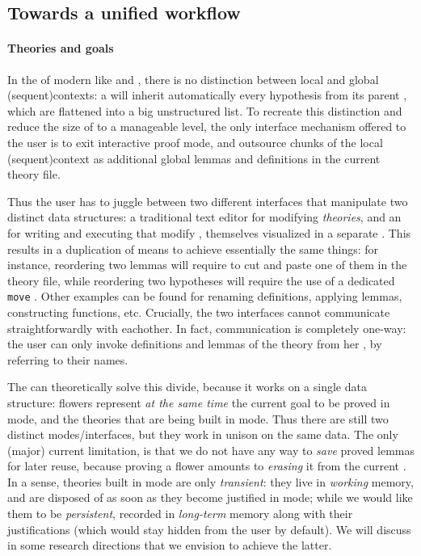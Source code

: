 \begin{scope}
\subsection{Towards a unified workflow}

\paragraph{Theories and goals}

In the  of modern  like  and
, there is no distinction between local and global
\kl(sequent){contexts}: a  will inherit automatically every
hypothesis from its parent , which are flattened into a big
unstructured list. To recreate this distinction and reduce the size of
 to a manageable level, the only interface mechanism offered to the
user is to exit interactive proof mode, and outsource chunks of the local
\kl(sequent){context} as additional global lemmas and definitions in the current
theory file.

Thus the user has to juggle between two different interfaces that manipulate two
distinct data structures: a traditional text editor for modifying
\emph{theories}, and an  for writing and executing 
that modify \emph{}, themselves visualized in a separate . This results in a duplication of means to achieve essentially the same
things: for instance, reordering two lemmas will require to cut and paste one of
them in the theory file, while reordering two hypotheses will require the use of
a dedicated \texttt{move} . Other examples can be found for renaming
definitions, applying lemmas, constructing functions, etc. Crucially, the two
interfaces cannot communicate straightforwardly with eachother. In fact,
communication is completely one-way: the user can only invoke definitions and
lemmas of the theory from her , by referring to their names.

The  can theoretically solve this divide, because it works on a
single data structure: flowers represent \emph{at the same time} the current
goal to be proved in  mode, and the theories that are being built in 
mode. Thus there are still two distinct modes/interfaces, but they work in
unison on the same data. The only (major) current limitation, is that we do not
have any way to \emph{save} proved lemmas for later reuse, because proving a
flower amounts to \emph{erasing} it from the current . In a sense, theories
built in  mode are only \emph{transient}: they live in \emph{working}
memory, and are disposed of as soon as they become justified in  mode;
while we would like them to be \emph{persistent}, recorded in \emph{long-term}
memory along with their justifications (which would stay hidden from the user by
default). We will discuss in  some research directions that
we envision to achieve the latter. 


\end{scope}
